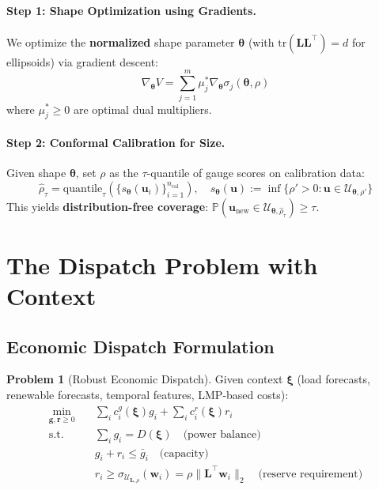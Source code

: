 \documentclass[11pt]{article}
\newcommand{\Prob}{\mathbb{P}}
\newcommand{\cU}{\mathcal{U}}
\newcommand{\btheta}{\bm{\theta}}
\newcommand{\bxi}{\bm{\xi}}
\newcommand{\bu}{\bm{u}}
\newcommand{\bw}{\bm{w}}
\newcommand{\bL}{\bm{L}}
\newcommand{\bg}{\bm{g}}
\newcommand{\br}{\bm{r}}
\theoremstyle{definition}
\newtheorem{problem}{Problem}
\begin{document}
\paragraph{Step 1: Shape Optimization using Gradients.}
We optimize the \textbf{normalized} shape parameter $\btheta$ (with $\text{tr}(\bL\bL^\top) = d$ for ellipsoids) via gradient descent:
\begin{equation}\label{eq:envelope}
\boxed{
\nabla_{\btheta} V = \sum_{j=1}^m \mu_j^* \nabla_{\btheta} \sigma_j(\btheta,\rho)
}
\end{equation}
where $\mu_j^* \ge 0$ are optimal dual multipliers. 

\paragraph{Step 2: Conformal Calibration for Size.}
Given shape $\btheta$, set $\rho$ as the $\tau$-quantile of gauge scores on calibration data:
\begin{equation}
\hat{\rho}_\tau = \text{quantile}_\tau\left(\{s_{\btheta}(\bu_i)\}_{i=1}^{n_{\text{cal}}}\right), \quad s_{\btheta}(\bu) := \inf\{\rho' > 0 : \bu \in \cU_{\btheta,\rho'}\}
\end{equation}
This yields \textbf{distribution-free coverage}: $\Prob(\bu_{\text{new}} \in \cU_{\btheta,\hat{\rho}_\tau}) \ge \tau$.

\section{The Dispatch Problem with Context}

\subsection{Economic Dispatch Formulation}

\begin{problem}[Robust Economic Dispatch]
Given context $\bxi$ (load forecasts, renewable forecasts, temporal features, LMP-based costs):
\begin{align}
\min_{\bg, \br \ge 0} \quad & \sum_i c_i^g(\bxi) g_i + \sum_i c_i^r(\bxi) r_i \label{eq:dispatch-obj}\\
\text{s.t.} \quad & \sum_i g_i = D(\bxi) \quad \text{(power balance)} \label{eq:balance}\\
& g_i + r_i \le \bar{g}_i \quad \text{(capacity)} \label{eq:capacity}\\
& r_i \ge \sigma_{\cU_{\bL,\rho}}(\bw_i) = \rho \|\bL^\top \bw_i\|_2 \quad \text{(reserve requirement)} \label{eq:reserve}
\end{align}
\end{problem}
\end{document}
